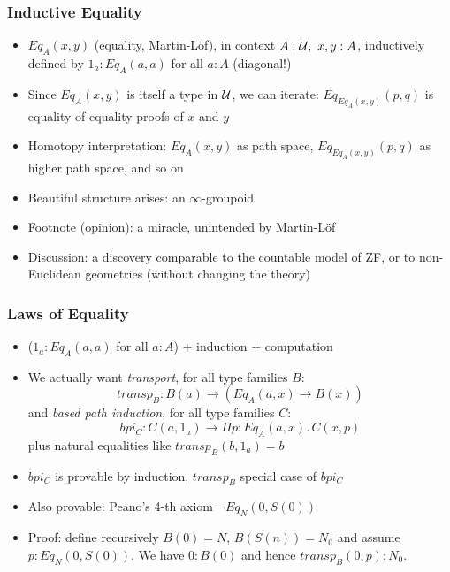 \documentclass[handout]{beamer}
\newcommand{\depi}[3]{\Pi{#1{:}#2.\,#3}}
\newcommand{\sigm}[3]{\Sigma{#1{:}#2.\,#3}}
\newcommand{\UU}{{\cal U}}
\begin{document}
 \frame
  {

    \frametitle{Inductive Equality}

    \begin{itemize}[<+->]
    \item $Eq_A(x,y)$ (equality, Martin-L\"of), in context $A:\UU,~x,y:A$,
    inductively defined by $1_a : Eq_A(a,a)$ for all $a:A$ (diagonal!)
    \item Since $Eq_A(x,y)$ is itself a type in $\UU$, we can iterate:
    $Eq_{Eq_A(x,y)}(p,q)$ is equality of equality proofs of $x$ and $y$
    \item Homotopy interpretation: $Eq_A(x,y)$ as path space,
$Eq_{Eq_A(x,y)}(p,q)$ as higher path space, and so on
   \item Beautiful structure arises: an $\infty$-groupoid
   \item Footnote (opinion): a miracle, unintended by Martin-L\"of
   \item Discussion: a discovery comparable to the countable model of ZF,
   or to non-Euclidean geometries (without changing the theory)
    \end{itemize}
  }

 \frame
  {

    \frametitle{Laws of Equality}

    \begin{itemize}[<+->]
    \item ($1_a : Eq_A(a,a)$ for all $a:A$) + induction + computation
    \item We actually want \emph{transport}, for all type families $B$:
    \[ transp_B : B(a) \to (Eq_A(a,x) \to B(x))  \]
    and \emph{based path induction}, for all type families $C$:
    \[ bpi_C : C(a,1_a) \to \depi{p}{Eq_A(a,x)}{ C(x,p)}  \]
    plus natural equalities like $transp_B(b,1_a) = b$
    \item $bpi_C$ is provable by induction, $transp_B$ special case of $bpi_C$
    \item Also provable: Peano's 4-th axiom $\neg Eq_N(0,S(0))$
    \item Proof: define recursively $B(0)=N$, $B(S(n))=N_0$ and assume
    $p:Eq_N(0,S(0))$. We have $0:B(0)$  and hence $transp_B(0,p) : N_0$.
    \end{itemize}
  }
\end{document}
